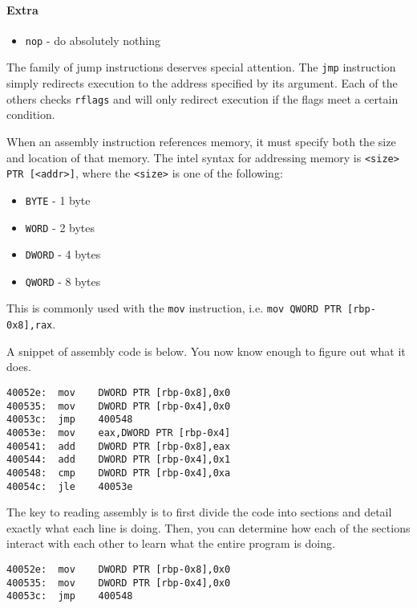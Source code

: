 \documentclass{article}
\begin{document}
\paragraph{Extra}
\begin{itemize}
    \item \texttt{nop} - do absolutely nothing
\end{itemize}

The family of jump instructions deserves special attention. The \texttt{jmp}
instruction simply redirects execution to the address specified by its argument.
Each of the others checks \texttt{rflags} and will only redirect execution if
the flags meet a certain condition.

When an assembly instruction references memory, it must specify both the
size and location of that memory. The intel syntax for addressing memory is
\texttt{<size> PTR [<addr>]}, where the \texttt{<size>} is one of the following:
\begin{itemize}
    \item \texttt{BYTE} - 1 byte
    \item \texttt{WORD} - 2 bytes
    \item \texttt{DWORD} - 4 bytes
    \item \texttt{QWORD} - 8 bytes
\end{itemize}

This is commonly used with the \texttt{mov} instruction, i.e. \texttt{mov
QWORD PTR [rbp-0x8],rax}. 

A snippet of assembly code is below. You now know enough to figure out what it
does.

\begin{lstlisting}
40052e:  mov    DWORD PTR [rbp-0x8],0x0
400535:  mov    DWORD PTR [rbp-0x4],0x0
40053c:  jmp    400548
40053e:  mov    eax,DWORD PTR [rbp-0x4]
400541:  add    DWORD PTR [rbp-0x8],eax
400544:  add    DWORD PTR [rbp-0x4],0x1
400548:  cmp    DWORD PTR [rbp-0x4],0xa
40054c:  jle    40053e
\end{lstlisting}

The key to reading assembly is to first divide the code into sections and detail
exactly what each line is doing. Then, you can determine how each of the
sections interact with each other to learn what the entire program is doing.

\begin{lstlisting}
40052e:  mov    DWORD PTR [rbp-0x8],0x0
400535:  mov    DWORD PTR [rbp-0x4],0x0
40053c:  jmp    400548
\end{lstlisting}
\end{document}
